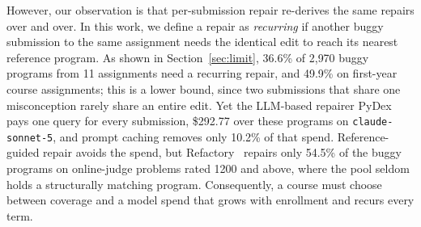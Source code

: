 \documentclass[acmsmall,screen,review,anonymous,nonacm]{acmart}
\newcommand{\cs}{\texttt{claude-sonnet-5}\xspace}
\begin{document}
However, our observation is that per-submission repair re-derives the same repairs over and over. In this work, we define a repair as \emph{recurring} if another buggy submission to the same assignment needs the identical edit to reach its nearest reference program. As shown in Section~\ref{sec:limit}, 36.6\% of 2{,}970 buggy programs from 11 assignments need a recurring repair, and 49.9\% on first-year course assignments; this is a lower bound, since two submissions that share one misconception rarely share an entire edit. Yet the LLM-based repairer PyDex~\cite{zhang2024pydex} pays one query for every submission, \$292.77 over these programs on \cs, and prompt caching removes only 10.2\% of that spend. Reference-guided repair avoids the spend, but Refactory~\cite{hu2019re} repairs only 54.5\% of the buggy programs on online-judge problems rated 1200 and above, where the pool seldom holds a structurally matching program. Consequently, a course must choose between coverage and a model spend that grows with enrollment and recurs every term.
\end{document}
